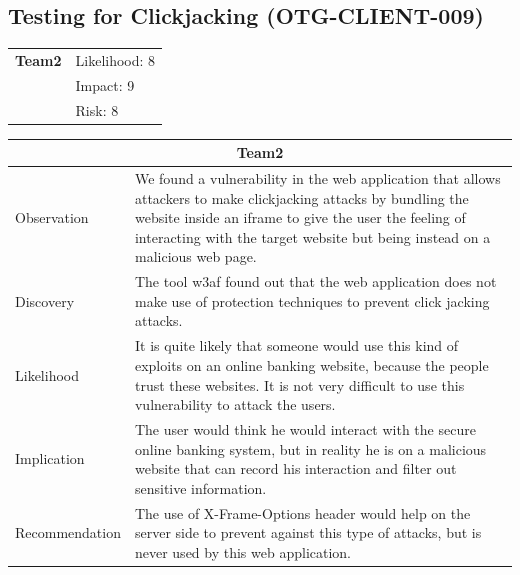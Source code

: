 \documentclass[headsepline,footsepline,footinclude=false,oneside,fontsize=11pt,paper=a4,listof=totoc,bibliography=totoc]{scrbook} %
\begin{document}
\subsection{Testing for Clickjacking (OTG-CLIENT-009) }
\begin{tabular}{cR{12cm}}
	\textbf{Team2} & Likelihood: 8\\& Impact: 9\\& Risk: 8
\end{tabular}

\begin{tabular}{ l|p{11cm}  }
	\hline
	\multicolumn{2}{c}{\textbf{Team2}} \\
	\hline
	Observation   & We found a vulnerability in the web application that allows
	attackers to make clickjacking attacks by bundling the website
	inside an iframe to give the user the feeling of interacting with
	the target website but being instead on a malicious web page.  \\
	Discovery  & The tool w3af found out that the web application does not make
	use of protection techniques to prevent click jacking attacks.  \\
	Likelihood &  It is quite likely that someone would use this kind of exploits
	on an online banking website, because the people trust these
	websites. It is not very difficult to use this vulnerability to attack
	the users. \\
	Implication    & The user would think he would interact with the secure online
	banking system, but in reality he is on a malicious website that
	can record his interaction and filter out sensitive information. \\
	Recommendation & The use of X-Frame-Options header would help on the server side to
	prevent against this type of attacks, but is never used by this web
	application.  \\
	\hline
\end{tabular}
\\
\vspace{0.5cm}
\\
\end{document}
